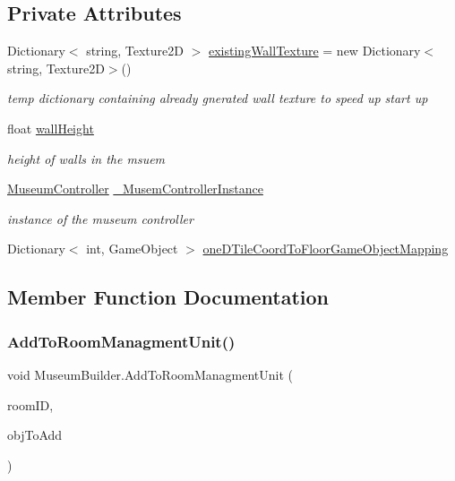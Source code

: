 \subsection*{Private Attributes}
\begin{DoxyCompactItemize}
\item 
Dictionary$<$ string, Texture2D $>$ \mbox{\hyperlink{class_museum_builder_a044a6c2df10a05c3bc9d2de8eb9ad890}{existing\+Wall\+Texture}} = new Dictionary$<$string, Texture2D$>$()
\begin{DoxyCompactList}\small\item\em temp dictionary containing already gnerated wall texture to speed up start up \end{DoxyCompactList}\item 
float \mbox{\hyperlink{class_museum_builder_ae878fab80ac14114029e1fe78877f26a}{wall\+Height}}
\begin{DoxyCompactList}\small\item\em height of walls in the msuem \end{DoxyCompactList}\item 
\mbox{\hyperlink{class_museum_controller}{Museum\+Controller}} \mbox{\hyperlink{class_museum_builder_ab63ff4582a395d2172a05542dbca8341}{\+\_\+\+Musem\+Controller\+Instance}}
\begin{DoxyCompactList}\small\item\em instance of the museum controller \end{DoxyCompactList}\item 
Dictionary$<$ int, Game\+Object $>$ \mbox{\hyperlink{class_museum_builder_a64a142acbbd1fe905fd89d8aa3163296}{one\+D\+Tile\+Coord\+To\+Floor\+Game\+Object\+Mapping}}
\end{DoxyCompactItemize}


\subsection{Member Function Documentation}
\mbox{\label{class_museum_builder_ad1991ecd1258a2eb6d020d3c429ad9c8}} 
\subsubsection{\texorpdfstring{Add\+To\+Room\+Managment\+Unit()}{AddToRoomManagmentUnit()}}
{\footnotesize\ttfamily void Museum\+Builder.\+Add\+To\+Room\+Managment\+Unit (\begin{DoxyParamCaption}\item[{uint}]{room\+ID,  }\item[{Game\+Object}]{obj\+To\+Add }\end{DoxyParamCaption})\hspace{0.3cm}{\ttfamily [private]}}



